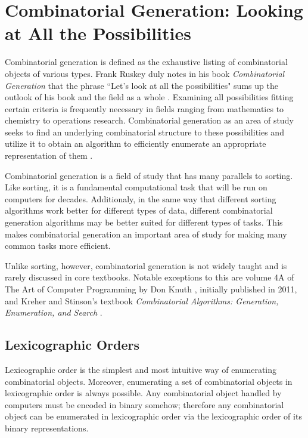 
\section{Combinatorial Generation: Looking at All the Possibilities}

Combinatorial generation is defined as the exhaustive listing of combinatorial objects of various types.  Frank Ruskey duly notes in his book \emph{Combinatorial Generation} that the phrase ``Let's look at all the possibilities" sums up the outlook of his book and the field as a whole \cite{ruskey2003combinatorial}. Examining all possibilities fitting certain criteria is frequently necessary in fields ranging from mathematics to chemistry to operations research. Combinatorial generation as an area of study seeks to find an underlying combinatorial structure to these possibilities and utilize it to obtain an algorithm to efficiently enumerate an appropriate representation of them \cite{ruskey2003combinatorial}. 

Combinatorial generation is a field of study that has many parallels to sorting.  Like sorting, it is a fundamental computational task that will be run on computers for decades.  Additionaly, in the same way that different sorting algorithms work better for different types of data, different combinatorial generation algorithms may be better suited for different types of tasks.  This makes combinatorial generation an important area of study for making many common tasks more efficient.  

Unlike sorting, however, combinatorial generation is not widely taught and is rarely discussed in core textbooks. Notable exceptions to this are volume 4A of The Art of Computer Programming by Don Knuth \cite{knuth2015art}, initially published in 2011, and Kreher and Stinson's textbook \emph{Combinatorial Algorithms: Generation, Enumeration, and Search} \cite{kreher2020combinatorial}.

\subsection{Lexicographic Orders}
Lexicographic order is the simplest and most intuitive way of enumerating combinatorial objects.  Moreover, enumerating a set of combinatorial objects in lexicographic order is always possible. Any combinatorial object handled by computers must be encoded in binary somehow; therefore any combinatorial object can be enumerated in lexicographic order via the lexicographic order of its binary representations. 

